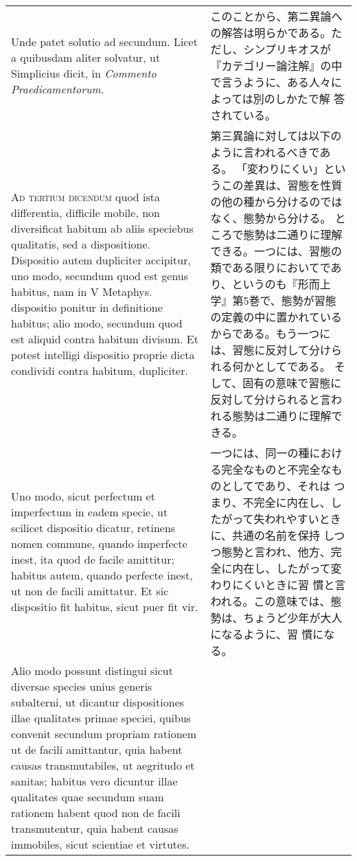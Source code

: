 \documentclass[10pt]{jsarticle} %
\begin{document}
\begin{longtable}{p{21em}p{21em}}
\\



Unde patet solutio ad secundum. Licet a quibusdam aliter solvatur, ut
Simplicius dicit, in {\itshape Commento Praedicamentorum}.

&

このことから、第二異論への解答は明らかである。ただし、シンプリキオスが
『カテゴリー論注解』の中で言うように、ある人々によっては別のしかたで解
答されている。

\\



{\scshape Ad tertium dicendum} quod ista differentia, difficile mobile, non
diversificat habitum ab aliis speciebus qualitatis, sed a
dispositione. Dispositio autem dupliciter accipitur, uno modo,
secundum quod est genus habitus, nam in V Metaphys. dispositio ponitur
in definitione habitus; alio modo, secundum quod est aliquid contra
habitum divisum. Et potest intelligi dispositio proprie dicta
condividi contra habitum, dupliciter. 


&

第三異論に対しては以下のように言われるべきである。
「変わりにくい」というこの差異は、習態を性質の他の種から分けるのではなく、態勢から分ける。
ところで態勢は二通りに理解できる。一つには、習態の類である限りにおいてであり、というのも『形而上学』第5巻で、態勢が習態の定義の中に置かれているからである。もう一つには、習態に反対して分けられる何かとしてである。
そして、固有の意味で習態に反対して分けられると言われる態勢は二通りに理解できる。

\\


Uno modo, sicut perfectum et
imperfectum in eadem specie, ut scilicet dispositio dicatur, retinens
nomen commune, quando imperfecte inest, ita quod de facile amittitur;
habitus autem, quando perfecte inest, ut non de facili amittatur. Et
sic dispositio fit habitus, sicut puer fit vir. 


&

一つには、同一の種における完全なものと不完全なものとしてであり、それは
つまり、不完全に内在し、したがって失われやすいときに、共通の名前を保持
しつつ態勢と言われ、他方、完全に内在し、したがって変わりにくいときに習
慣と言われる。この意味では、態勢は、ちょうど少年が大人になるように、習
慣になる。

\\

Alio modo possunt
distingui sicut diversae species unius generis subalterni, ut dicantur
dispositiones illae qualitates primae speciei, quibus convenit
secundum propriam rationem ut de facili amittantur, quia habent causas
transmutabiles, ut aegritudo et sanitas; habitus vero dicuntur illae
qualitates quae secundum suam rationem habent quod non de facili
transmutentur, quia habent causas immobiles, sicut scientiae et
virtutes. 



\end{longtable}
\end{document}
